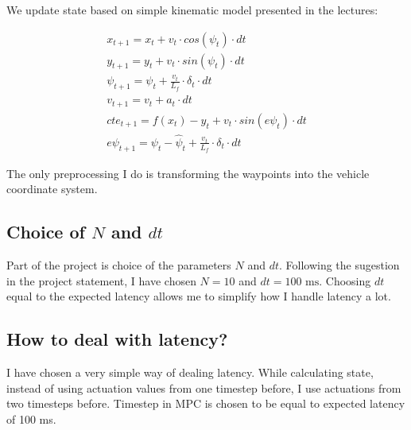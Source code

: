 \documentclass[12pt]{article}
\begin{document}
We update state based on simple kinematic model presented in the lectures:

\begin{align}
    x_{t+1} = x_t + v_t \cdot cos(\psi_t) \cdot dt \\
    y_{t+1} = y_t + v_t \cdot sin(\psi_t) \cdot dt \\
    \psi_{t+1} = \psi_t + \frac{v_t}{L_f} \cdot \delta_t \cdot dt \\
    v_{t+1} = v_t + a_t \cdot dt \\
    cte_{t+1} = f(x_t) - y_t + v_t \cdot sin(e\psi_t) \cdot dt \\
    e\psi_{t+1} = \psi_t - \hat \psi_t + \frac{v_t}{L_f} \cdot \delta_t \cdot dt
\end{align}

The only preprocessing I do is transforming the waypoints into the vehicle coordinate system.

\subsection{Choice of $N$ and $dt$}
Part of the project is choice of the parameters $N$ and $dt$. Following the sugestion in the
project statement, I have chosen $N = 10$ and $dt = 100 \text{ ms}$. Choosing $dt$ equal to
the expected latency allows me to simplify how I handle latency a lot.

\subsection{How to deal with latency?}
I have chosen a very simple way of dealing latency. While calculating state,
instead of using actuation values from one timestep before, I use actuations from two
timesteps before. Timestep in MPC is chosen to be equal to expected latency of 100 ms.
\end{document}
